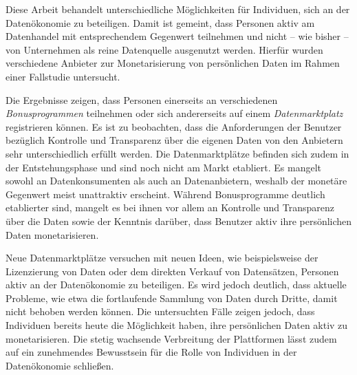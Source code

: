 Diese Arbeit behandelt unterschiedliche Möglichkeiten für Individuen, sich an der Datenökonomie zu beteiligen. Damit ist gemeint, dass Personen aktiv am Datenhandel mit entsprechendem Gegenwert teilnehmen und nicht -- wie bisher -- von Unternehmen als reine Datenquelle ausgenutzt werden. Hierfür wurden verschiedene Anbieter zur Monetarisierung von persönlichen Daten im Rahmen einer Fallstudie untersucht. \newline

\noindent Die Ergebnisse zeigen, dass Personen einerseits an verschiedenen \textit{Bonusprogrammen} teilnehmen oder sich andererseits auf einem \textit{Datenmarktplatz} registrieren können. Es ist zu beobachten, dass die Anforderungen der Benutzer bezüglich Kontrolle und Transparenz über die eigenen Daten von den Anbietern sehr unterschiedlich erfüllt werden. Die Datenmarktplätze befinden sich zudem in der Entstehungsphase und sind noch nicht am Markt etabliert. Es mangelt sowohl an Datenkonsumenten als auch an Datenanbietern, weshalb der monetäre Gegenwert meist unattraktiv erscheint. Während Bonusprogramme deutlich etablierter sind, mangelt es bei ihnen vor allem an Kontrolle und Transparenz über die Daten sowie der Kenntnis darüber, dass Benutzer aktiv ihre persönlichen Daten monetarisieren. \newline

\noindent Neue Datenmarktplätze versuchen mit neuen Ideen, wie beispielsweise der Lizenzierung von Daten oder dem direkten Verkauf von Datensätzen, Personen aktiv an der Datenökonomie zu beteiligen. Es wird jedoch deutlich, dass aktuelle Probleme, wie etwa die fortlaufende Sammlung von Daten durch Dritte, damit nicht behoben werden können. Die untersuchten Fälle zeigen jedoch, dass Individuen bereits heute die Möglichkeit haben, ihre persönlichen Daten aktiv zu monetarisieren. Die stetig wachsende Verbreitung der Plattformen lässt zudem auf ein zunehmendes Bewusstsein für die Rolle von Individuen in der Datenökonomie schließen.